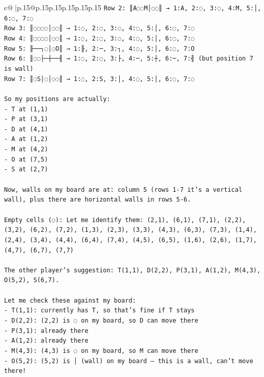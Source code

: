 \documentclass{article}
\begin{document}
{\begin{supertabular}{c@{$\;$}|p{.15\linewidth}@{}p{.15\linewidth}p{.15\linewidth}p{.15\linewidth}p{.15\linewidth}p{.15\linewidth}}
{{{\texttt{Row 2: ║A◌◌M│◌◌║ → 1:A, 2:◌, 3:◌, 4:M, 5:│, 6:◌, 7:◌} \\
\texttt{Row 3: ║◌◌◌◌│◌◌║ → 1:◌, 2:◌, 3:◌, 4:◌, 5:│, 6:◌, 7:◌} \\
\texttt{Row 4: ║◌◌◌◌│◌◌║ → 1:◌, 2:◌, 3:◌, 4:◌, 5:│, 6:◌, 7:◌} \\
\texttt{Row 5: ╟──┐◌│◌O║ → 1:╟, 2:─, 3:┐, 4:◌, 5:│, 6:◌, 7:O} \\
\texttt{Row 6: ║◌◌├─┼──╢ → 1:◌, 2:◌, 3:├, 4:─, 5:┼, 6:─, 7:╢ (but position 7 is wall)} \\
\texttt{Row 7: ║◌S│◌│◌◌║ → 1:◌, 2:S, 3:│, 4:◌, 5:│, 6:◌, 7:◌} \\
\\ 
\texttt{So my positions are actually:} \\
\texttt{{-} T at (1,1)} \\
\texttt{{-} P at (3,1)} \\
\texttt{{-} D at (4,1)} \\
\texttt{{-} A at (1,2)} \\
\texttt{{-} M at (4,2)} \\
\texttt{{-} O at (7,5)} \\
\texttt{{-} S at (2,7)} \\
\\ 
\texttt{Now, walls on my board are at: column 5 (rows 1{-}7 it's a vertical wall), plus there are horizontal walls in rows 5{-}6.} \\
\\ 
\texttt{Empty cells (◌): Let me identify them: (2,1), (6,1), (7,1), (2,2), (3,2), (6,2), (7,2), (1,3), (2,3), (3,3), (4,3), (6,3), (7,3), (1,4), (2,4), (3,4), (4,4), (6,4), (7,4), (4,5), (6,5), (1,6), (2,6), (1,7), (4,7), (6,7), (7,7)} \\
\\ 
\texttt{The other player's suggestion: T(1,1), D(2,2), P(3,1), A(1,2), M(4,3), O(5,2), S(6,7).} \\
\\ 
\texttt{Let me check these against my board:} \\
\texttt{{-} T(1,1): currently has T, so that's fine if T stays} \\
\texttt{{-} D(2,2): (2,2) is ◌ on my board, so D can move there} \\
\texttt{{-} P(3,1): already there} \\
\texttt{{-} A(1,2): already there} \\
\texttt{{-} M(4,3): (4,3) is ◌ on my board, so M can move there} \\
\texttt{{-} O(5,2): (5,2) is │ (wall) on my board — this is a wall, can't move there!} \\
}}}
\end{supertabular}}
\end{document}
